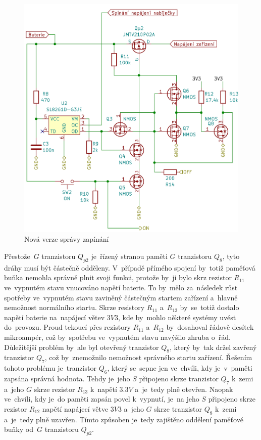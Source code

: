\begin{figure}[h!]
    \centering
    \includegraphics[width=\textwidth]{text/PraktickaCast/img/power_manager.png}
    \caption{Nová verze správy zapínání}
    \label{fig:PoverManager}
\end{figure}

Přestože~\(G\) tranzistoru \(Q_{p2}\) je~řízený stranou paměti \(G\) tranzistoru \(Q_{8}\), tyto dráhy musí být částečně odděleny.
V~případě přímého spojení by~totiž paměťová buňka nemohla správně plnit svoji funkci, protože by~ji bylo skrz rezistor \(R_{11}\) ve~vypnutém stavu vnucováno napětí baterie.
To by~mělo za~následek růst spotřeby ve~vypnutém stavu zaviněný částečným startem zařízení a~hlavně nemožnost normálního startu.
Skrze resistory \(R_{11}\) a~\(R_{12}\) by~se~totiž dostalo napětí baterie na~napájecí větev \(3V3\), kde by~mohlo některé systémy uvést do~provozu.
Proud tekoucí přes rezistory \(R_{11}\) a~\(R_{12}\) by~dosahoval řádově desítek mikroampér, což by~spotřebu ve~vypnutém stavu navýšilo zhruba o~řád.
Důležitější problém by~ale byl otevřený tranzistor \(Q_{8}\), který by~tak držel zavřený tranzistor \(Q_{7}\), což by~znemožnilo nemožnost správného startu zařízení.
Řešením tohoto problému je~tranzistor \(Q_{6}\), který se~sepne jen ve~chvíli, kdy je~v~paměti zapsána správná hodnota.
Tehdy je~jeho \(S\) připojeno skrze tranzistor \(Q_{7}\) k~zemi a~jeho \(G\) skrze rezistor \(R_{13}\) k~napětí \(3.3 V\) a~je~tedy plně otevřen.
Naopak ve~chvíli, kdy je~do paměti zapsán povel k~vypnutí, je~na jeho \(S\) připojeno skrze rezistor \(R_{12}\) napětí napájecí větve \(3V3\) a~jeho \(G\) skrze tranzistor \(Q_{8}\) k~zemi a~je~tedy plně uzavřen.
Tímto způsoben je~tedy zajištěno oddělení paměťové buňky od~\(G\) tranzistoru \(Q_{p2}\).

